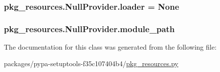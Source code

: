 \subsubsection[{loader}]{\setlength{\rightskip}{0pt plus 5cm}pkg\+\_\+resources.\+Null\+Provider.\+loader = None\hspace{0.3cm}{\ttfamily [static]}}\label{classpkg__resources_1_1NullProvider_a824227ff9d57076b31e81215e482615e}
\hypertarget{classpkg__resources_1_1NullProvider_a90c7b6ef27446c70d03cb2b634b31e97}{}
\subsubsection[{module\+\_\+path}]{\setlength{\rightskip}{0pt plus 5cm}pkg\+\_\+resources.\+Null\+Provider.\+module\+\_\+path}\label{classpkg__resources_1_1NullProvider_a90c7b6ef27446c70d03cb2b634b31e97}


The documentation for this class was generated from the following file\+:\begin{DoxyCompactItemize}
\item 
packages/pypa-\/setuptools-\/f35c107404b4/\hyperlink{pkg__resources_8py}{pkg\+\_\+resources.\+py}\end{DoxyCompactItemize}
